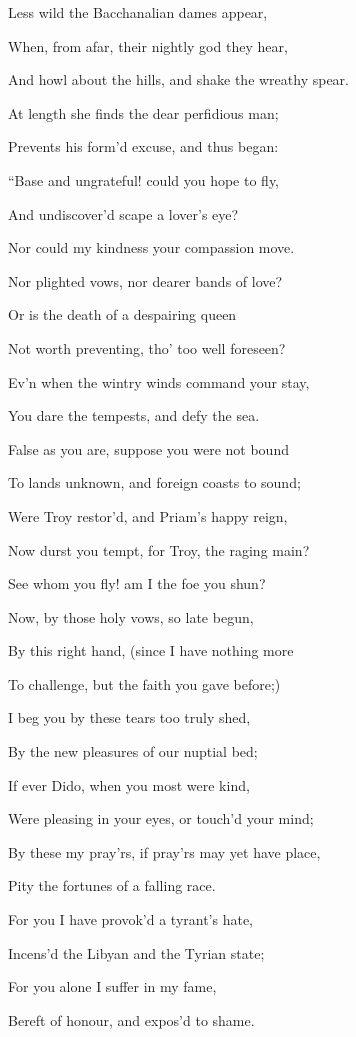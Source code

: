 Less wild the Bacchanalian dames appear,

When, from afar, their nightly god they hear,

And howl about the hills, and shake the wreathy spear.

At length she finds the dear perfidious man;

Prevents his form’d excuse, and thus began:

“Base and ungrateful! could you hope to fly,

And undiscover’d scape a lover’s eye?

Nor could my kindness your compassion move.

Nor plighted vows, nor dearer bands of love?

Or is the death of a despairing queen

Not worth preventing, tho’ too well foreseen?

Ev’n when the wintry winds command your stay,

You dare the tempests, and defy the sea.

False as you are, suppose you were not bound

To lands unknown, and foreign coasts to sound;

Were Troy restor’d, and Priam’s happy reign,

Now durst you tempt, for Troy, the raging main?

See whom you fly! am I the foe you shun?

Now, by those holy vows, so late begun,

By this right hand, (since I have nothing more

To challenge, but the faith you gave before;)

I beg you by these tears too truly shed,

By the new pleasures of our nuptial bed;

If ever Dido, when you most were kind,

Were pleasing in your eyes, or touch’d your mind;

By these my pray’rs, if pray’rs may yet have place,

Pity the fortunes of a falling race.

For you I have provok’d a tyrant’s hate,

Incens’d the Libyan and the Tyrian state;

For you alone I suffer in my fame,

Bereft of honour, and expos’d to shame.

